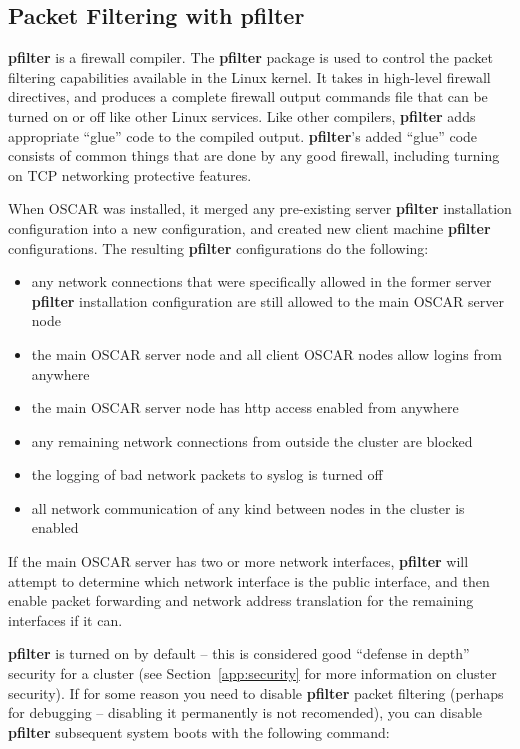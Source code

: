 %
%
%

\subsection{Packet Filtering with pfilter}
\label{app:pfilter-overview}

{\bf pfilter} is a firewall compiler.  The {\bf pfilter} package is
used to control the packet filtering capabilities available in the
Linux kernel.  It takes in high-level firewall directives, and
produces a complete firewall output commands file that can be turned
on or off like other Linux services.  Like other compilers, {\bf
  pfilter} adds appropriate ``glue'' code to the compiled output.
{\bf pfilter}'s added ``glue'' code consists of common things that are
done by any good firewall, including turning on TCP networking
protective features.

When OSCAR was installed, it merged any pre-existing server 
{\bf pfilter} installation configuration into a new configuration,
and created new client machine {\bf pfilter} configurations. 
The resulting {\bf pfilter} configurations do the following:

\begin{itemize}
\item any network connections that were specifically allowed in the
former server {\bf pfilter} installation configuration are still allowed 
to the main OSCAR server node
\item the main OSCAR server node and all client OSCAR nodes allow logins from anywhere
\item the main OSCAR server node has http access enabled from anywhere
\item any remaining network connections from outside the cluster are blocked
\item the logging of bad network packets to syslog is turned off
\item all network communication of any kind between nodes in the cluster is enabled
\end{itemize}

If the main OSCAR server has two or more network interfaces, {\bf pfilter}
will attempt to determine which network interface is the public interface,
and then enable packet forwarding and network address translation for the 
remaining interfaces if it can.

{\bf pfilter} is turned on by default -- this is considered good
``defense in depth'' security for a cluster (see
Section~\ref{app:security} for more information on cluster security).
If for some reason you need to disable {\bf pfilter} packet filtering
(perhaps for debugging -- disabling it permanently is not recomended),
you can disable {\bf pfilter} subsequent system boots with the
following command:

